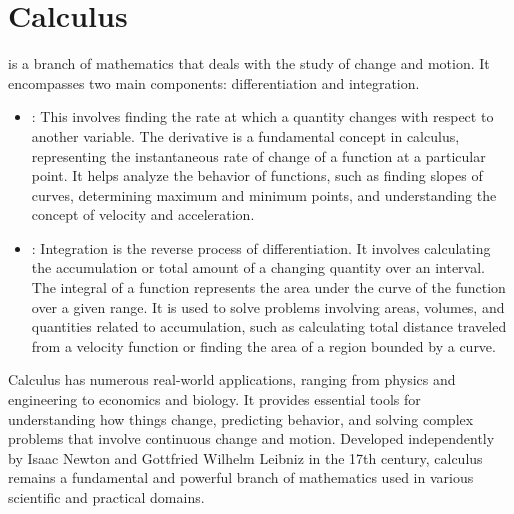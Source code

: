 \chapter{Calculus}
\thispagestyle{fancy}

 is a branch of mathematics that deals with the study of change and motion. It encompasses two main components: differentiation and integration.

\begin{itemize}
	\item {}: This involves finding the rate at which a quantity changes with respect to another variable. The derivative is a fundamental concept in calculus, representing the instantaneous rate of change of a function at a particular point. It helps analyze the behavior of functions, such as finding slopes of curves, determining maximum and minimum points, and understanding the concept of velocity and acceleration.
	
	\item {}: Integration is the reverse process of differentiation. It involves calculating the accumulation or total amount of a changing quantity over an interval. The integral of a function represents the area under the curve of the function over a given range. It is used to solve problems involving areas, volumes, and quantities related to accumulation, such as calculating total distance traveled from a velocity function or finding the area of a region bounded by a curve.
\end{itemize}

Calculus has numerous real-world applications, ranging from physics and engineering to economics and biology. It provides essential tools for understanding how things change, predicting behavior, and solving complex problems that involve continuous change and motion. Developed independently by Isaac Newton and Gottfried Wilhelm Leibniz in the 17th century, calculus remains a fundamental and powerful branch of mathematics used in various scientific and practical domains.










